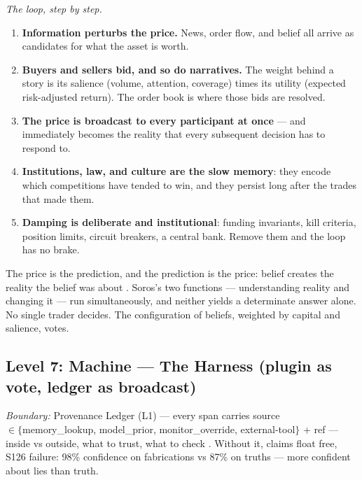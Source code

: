 \documentclass[11pt]{article}
\begin{document}
{\textit{The loop, step by step.}
\begin{enumerate}\itemsep2pt
\item \textbf{Information perturbs the price.} News, order flow, and
belief all arrive as candidates for what the asset is worth.
\item \textbf{Buyers and sellers bid, and so do narratives.} The weight
behind a story is its salience (volume, attention, coverage) times its
utility (expected risk-adjusted return). The order book is where those
bids are resolved.
\item \textbf{The price is broadcast to every participant at once} --- and
immediately becomes the reality that every subsequent decision has to
respond to.
\item \textbf{Institutions, law, and culture are the slow memory}: they
encode which competitions have tended to win, and they persist long after
the trades that made them.
\item \textbf{Damping is deliberate and institutional}: funding
invariants, kill criteria, position limits, circuit breakers, a central
bank. Remove them and the loop has no brake.
\end{enumerate}

The price is the prediction, and the prediction is the price: belief
creates the reality the belief was about \citep{soros1987}. Soros's two
functions --- understanding reality and changing it --- run simultaneously,
and neither yields a determinate answer alone. No single trader decides.
The configuration of beliefs, weighted by capital and salience, votes.

\subsection{Level 7: Machine --- The Harness (plugin as vote, ledger as broadcast)}

\textit{Boundary:} Provenance Ledger (L1) --- every span carries source\-\\$\in\{$memory\_lookup, model\_prior, monitor\_override, external-tool$\}$ + ref --- inside vs outside, what to trust, what to check \citep{gazzaniga2000,johansson2005}. Without it, claims float free, S126 failure: 98\% confidence on fabrications vs 87\% on truths --- more confident about lies than truth.

}
\end{document}

